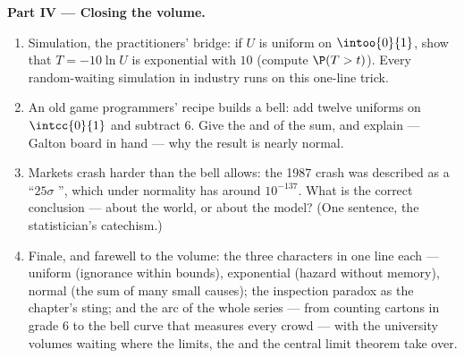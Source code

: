 \begin{problem}
\medskip
\noindent\textbf{Part IV --- Closing the volume.}
\begin{enumerate}[resume]
  \item Simulation, the practitioners' bridge: if $U$ is
        uniform on $\intoo{0}{1}$, show that
        $T = -10\ln U$ is exponential with  $10$ (compute
        $\P(T > t)$). Every random-waiting simulation in
        industry runs on this one-line trick.
  \item An old game programmers' recipe builds a bell: add
        twelve  uniforms on $\intcc{0}{1}$ and
        subtract $6$. Give the  and  of the sum,
        and explain --- Galton board in hand --- why the
        result is nearly normal.
  \item Markets crash harder than the bell allows: the 1987
        crash was described as a ``$25\sigma$ '', which
        under normality has  around $10^{-137}$.
        What is the correct conclusion --- about the world, or
        about the model? (One sentence, the statistician's
        catechism.)
  \item Finale, and farewell to the volume: the three
        characters in one line each --- uniform (ignorance
        within bounds), exponential (hazard without memory),
        normal (the sum of many small causes); the inspection
        paradox as the chapter's sting; and the arc of the
        whole series --- from counting cartons in grade 6 to
        the bell curve that measures every crowd --- with the
        university volumes waiting where the limits, the
         and the central limit theorem take over.
\end{enumerate}
\end{problem}
